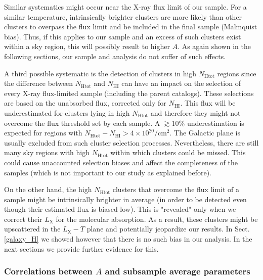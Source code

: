 \documentclass{aa}   %
\begin{document}
Similar systematics might occur near the X-ray flux limit of our sample. For a similar temperature, intrinsically brighter clusters are more likely than other clusters to overpass the flux limit and be included in the final sample (Malmquist bias). Thus, if this applies to our sample and an excess of such clusters exist within a sky region, this will possibly result to higher $A$.  As again shown in the following sections, our sample and analysis do not suffer of such effects. 

A third possible systematic is the detection of clusters in high $N_{\text{Htot}}$ regions since the difference between $N_{\text{Htot}}$ and $N_{\text{HI}}$ can have an impact on the selection of every X-ray flux-limited sample (including the parent catalogs). These selections are based on the unabsorbed flux, corrected only for $N_{\text{HI}}$. This flux will be underestimated for clusters lying in high $N_{\text{Htot}}$ and therefore they might not overcome the flux threshold set by each sample. A $\gtrsim 10\%$ underestimation is expected for regions with $N_{\text{Htot}}-N_{\text{HI}}>4\times10^{20}/$cm$^2$. The Galactic plane is usually excluded from such cluster selection processes. Nevertheless, there are still many sky regions with high $N_{\text{Htot}}$ within which clusters could be missed. This could cause unaccounted selection biases and affect the completeness of the samples (which is not important to our study as explained before).

On the other hand, the high $N_{\text{Htot}}$ clusters that overcome the flux limit of a sample might be intrinsically brighter in average (in order to be detected even though their estimated flux is biased low). This is "revealed" only when we correct their $L_{\text{X}}$ for the molecular absorption. As a result, these clusters might be upscattered in the $L_{\text{X}}-T$ plane and potentially jeopardize our results. In Sect. \ref{galaxy_H} we showed however that there is no such bias in our analysis. In the next sections we provide further evidence for this.

\subsubsection{Correlations between $A$ and subsample average parameters} \label{correl_sect}
\end{document}
